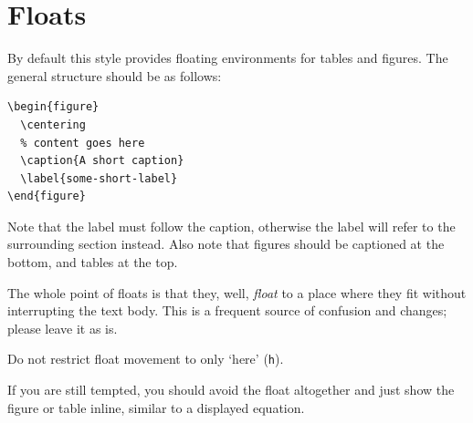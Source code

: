 \section{Floats}

By default this style provides floating environments for tables and
figures.  The general structure should be as follows:
\begin{lstlisting}
\begin{figure}
  \centering
  % content goes here
  \caption{A short caption}
  \label{some-short-label}
\end{figure}
\end{lstlisting}
Note that the label must follow the caption, otherwise the label will
refer to the surrounding section instead.  Also note that figures
should be captioned at the bottom, and tables at the top.

The whole point of floats is that they, well, \emph{float} to a place
where they fit without interrupting the text body.  This is a frequent
source of confusion and changes; please leave it as is.

\begin{Rule}
  Do not restrict float movement to only `here'
  \textnormal{(\lstinline-h-)}.
\end{Rule}

If you are still tempted, you should avoid the float altogether and
just show the figure or table inline, similar to a displayed equation.


